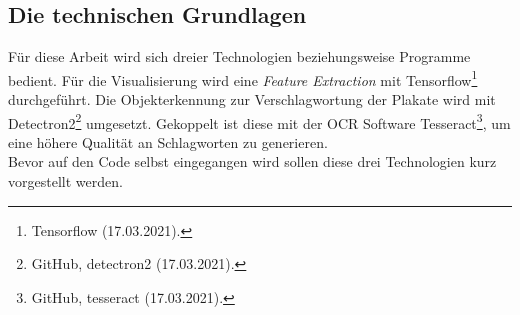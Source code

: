 \documentclass[a4paper,12pt,ngerman]{article}
\begin{document}
\subsection{Die technischen Grundlagen}
Für diese Arbeit wird sich dreier Technologien beziehungsweise Programme bedient. Für die Visualisierung wird eine \textit{Feature Extraction} mit Tensorflow\footnote{Tensorflow (17.03.2021).}  durchgeführt. Die Objekterkennung zur Verschlagwortung der Plakate wird mit Detectron2\footnote{GitHub, detectron2 (17.03.2021).} umgesetzt. Gekoppelt ist diese mit der OCR Software Tesseract\footnote{GitHub, tesseract (17.03.2021).}, um eine höhere Qualität an Schlagworten zu generieren. \\
Bevor auf den Code selbst eingegangen wird sollen diese drei Technologien kurz vorgestellt werden. \\
\end{document}
